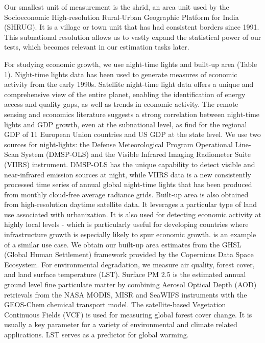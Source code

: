\documentclass[a4paper,12pt]{article}
\begin{document}
Our smallest unit of measurement is the shrid, an area unit used by the Socioeconomic High-resolution Rural-Urban Geographic Platform for India (SHRUG). It is a village or town unit that has had consistent borders since 1991. This subnational resolution allows us to vastly expand the statistical power of our tests, which becomes relevant in our estimation tasks later.

For studying economic growth, we use night-time lights and built-up area (Table 1). Night-time lights data has been used to generate measures of economic activity from the early 1990s. Satellite night-time light data offers a unique and comprehensive view of the entire planet, enabling the identification of energy access and quality gaps, as well as trends in economic activity. The remote sensing and economics literature suggests a strong correlation between night-time lights and GDP growth, even at the subnational level, as \textcite{doll2006} find for the regional GDP of 11 European Union countries and US GDP at the state level. We use two sources for night-lights: the Defense Meteorological Program Operational Line-Scan System (DMSP-OLS) and the Visible Infrared Imaging Radiometer Suite (VIIRS) instrument. DMSP-OLS has the unique capability to detect visible and near-infrared emission sources at night, while VIIRS data is a new consistently processed time series of annual global night-time lights that has been produced from monthly cloud-free average radiance grids.
Built-up area is also obtained from high-resolution daytime satellite data. It leverages a particular type of land use associated with urbanization. It is also used for detecting economic activity at highly local levels - which is particularly useful for developing countries where infrastructure growth is especially likely to spur economic growth. \textcite{baragwanath2021} is an example of a similar use case. We obtain our built-up area estimates from the GHSL (Global Human Settlement) framework provided by the Copernicus Data Space Ecosystem.
For environmental degradation, we measure air quality, forest cover, and land surface temperature (LST). Surface PM 2.5 is the estimated annual ground level fine particulate matter by combining Aerosol Optical Depth (AOD) retrievals from the NASA MODIS, MISR and SeaWIFS instruments with the GEOS-Chem chemical transport model. The satellite-based Vegetation Continuous Fields (VCF) is used for measuring global forest cover change. It is usually a key parameter for a variety of environmental and climate related applications. LST serves as a predictor for global warming.
\end{document}
